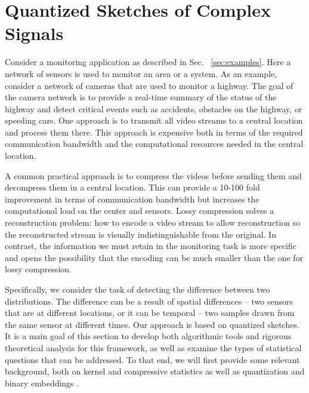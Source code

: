 \section{Quantized Sketches of Complex Signals}

Consider a monitoring application as described
in Sec. ~\ref{sec:examples}.  Here a network of sensors is used to
monitor an area or a system. As an example, consider a network of
cameras that are used to monitor a highway. The goal of the camera
network is to provide a real-time summary of the status of the highway
and detect critical events such as accidents, obstacles on the
highway, or speeding cars. One approach  is to transmit
all video streams to a central location and process them there. This
approach is expensive both in terms of the required communication
bandwidth and the computational resources needed in the central
location.

A common practical approach is to compress the videos before sending
them and decompress them in a central location. This 
can provide a 10-100 fold improvement in terms of communication
bandwidth but increases the computational load on the center and sensors.
Lossy compression solves a reconstruction problem: how to encode a
video stream to allow reconstruction
so the reconstructed stream is visually indistinguishable from the
original. In contrast, the information we must retain in the
monitoring task is more specific and opens the possibility that
the encoding can be much smaller than the one  for lossy
compression.

Specifically, we consider the task of detecting the difference between
two distributions. The difference can be a result of spatial
differences -- two sensors that are at different locations, or it can be
temporal -- two samples drawn from the same sensor at different times.
Our approach is based on quantized sketches.
 It is a main goal of this section to develop both algorithmic tools and rigorous theoretical analysis for this framework, as well as examine the types of statistical questions that can be addressed. 
To that
end, we will first provide some relevant background, both on kernel
and compressive statistics
\cite{gretton2012kernel,gribonval2017compressive,cheng2017two}
as well as quantization and binary embeddings \cite{jacques2013robust,SaabIEEEIT,saab2018quantization,huynh2018fast}.  
 
